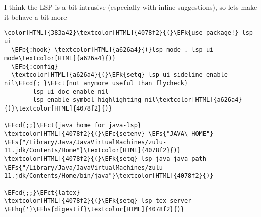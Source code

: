 \documentclass{scrartcl}
\newcommand{\EFk}[1]{\textcolor{EFk}{#1}} %
\newcommand{\EFs}[1]{\textcolor{EFs}{#1}} %
\newcommand{\EFb}[1]{\textcolor{EFb}{#1}} %
\newcommand{\EFct}[1]{\textcolor{EFct}{#1}} %
\newcommand{\EFc}[1]{\textcolor{EFc}{#1}} %
\newcommand{\EFcd}[1]{\textcolor{EFcd}{#1}} %
\newcommand{\EFhq}[1]{\textcolor{EFhq}{#1}} %
\newcommand{\EFhs}[1]{\textcolor{EFhs}{#1}} %
\begin{document}
I think the LSP is a bit intrusive (especially with inline suggestions), so lets make it behave a bit more
\begin{Code}
\begin{Verbatim}[]
\color[HTML]{383a42}\textcolor[HTML]{4078f2}{(}\EFk{use-package!} lsp-ui
  \EFb{:hook} \textcolor[HTML]{a626a4}{(}lsp-mode . lsp-ui-mode\textcolor[HTML]{a626a4}{)}
  \EFb{:config}
  \textcolor[HTML]{a626a4}{(}\EFk{setq} lsp-ui-sideline-enable nil\EFcd{; }\EFct{not anymore useful than flycheck}
        lsp-ui-doc-enable nil
        lsp-enable-symbol-highlighting nil\textcolor[HTML]{a626a4}{)}\textcolor[HTML]{4078f2}{)}

\EFcd{;;}\EFct{java home for java-lsp}
\textcolor[HTML]{4078f2}{(}\EFc{setenv} \EFs{"JAVA\_HOME"}  \EFs{"/Library/Java/JavaVirtualMachines/zulu-11.jdk/Contents/Home"}\textcolor[HTML]{4078f2}{)}
\textcolor[HTML]{4078f2}{(}\EFk{setq} lsp-java-java-path \EFs{"/Library/Java/JavaVirtualMachines/zulu-11.jdk/Contents/Home/bin/java"}\textcolor[HTML]{4078f2}{)}

\EFcd{;;}\EFct{latex}
\textcolor[HTML]{4078f2}{(}\EFk{setq} lsp-tex-server \EFhq{'}\EFhs{digestif}\textcolor[HTML]{4078f2}{)}
\end{Verbatim}
\end{Code}
\end{document}
